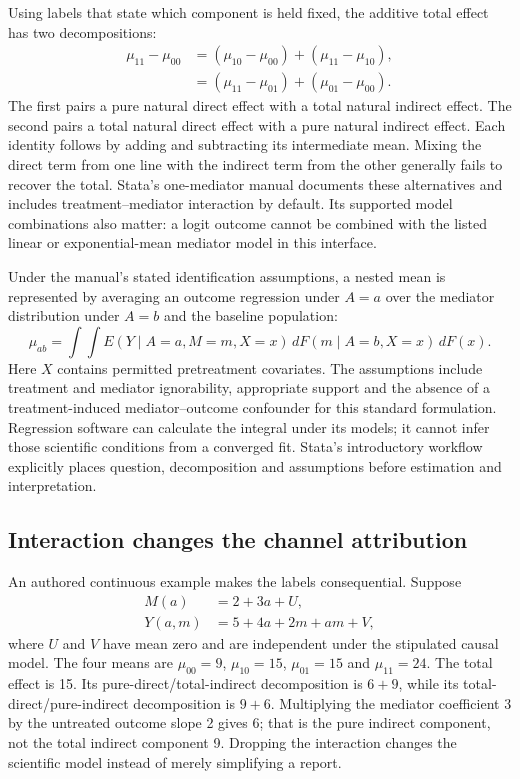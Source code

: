 Using labels that state which component is held fixed, the additive total effect has two decompositions:
\begin{align}
 \mu_{11}-\mu_{00}
  &=(\mu_{10}-\mu_{00})+(\mu_{11}-\mu_{10}),\nonumber\\
  &=(\mu_{11}-\mu_{01})+(\mu_{01}-\mu_{00}).
 \label{exec20:med-decompositions}
\end{align}
The first pairs a pure natural direct effect with a total natural indirect effect. The second pairs a total natural direct effect with a pure natural indirect effect. Each identity follows by adding and subtracting its intermediate mean. Mixing the direct term from one line with the indirect term from the other generally fails to recover the total. Stata's one-mediator manual documents these alternatives and includes treatment--mediator interaction by default. Its supported model combinations also matter: a logit outcome cannot be combined with the listed linear or exponential-mean mediator model in this interface.\citep{exec20_med_stata_one}

Under the manual's stated identification assumptions, a nested mean is represented by averaging an outcome regression under $A=a$ over the mediator distribution under $A=b$ and the baseline population:
\begin{equation}
 \mu_{ab}=\int\!\!\int
 E(Y\mid A=a,M=m,X=x)\,dF(m\mid A=b,X=x)\,dF(x).
 \label{exec20:med-integral}
\end{equation}
Here $X$ contains permitted pretreatment covariates. The assumptions include treatment and mediator ignorability, appropriate support and the absence of a treatment-induced mediator--outcome confounder for this standard formulation. Regression software can calculate the integral under its models; it cannot infer those scientific conditions from a converged fit. Stata's introductory workflow explicitly places question, decomposition and assumptions before estimation and interpretation.\citep{exec20_med_stata_one,exec20_med_stata_intro}

\subsection{Interaction changes the channel attribution}
\label{exec20:med-interaction}
An authored continuous example makes the labels consequential. Suppose
\begin{align}
 M(a)&=2+3a+U,\nonumber\\
 Y(a,m)&=5+4a+2m+am+V,
 \label{exec20:med-law}
\end{align}
where $U$ and $V$ have mean zero and are independent under the stipulated causal model. The four means are $\mu_{00}=9$, $\mu_{10}=15$, $\mu_{01}=15$ and $\mu_{11}=24$. The total effect is 15. Its pure-direct/total-indirect decomposition is $6+9$, while its total-direct/pure-indirect decomposition is $9+6$. Multiplying the mediator coefficient 3 by the untreated outcome slope 2 gives 6; that is the pure indirect component, not the total indirect component 9. Dropping the interaction changes the scientific model instead of merely simplifying a report.\citep{exec20_med_reference}

